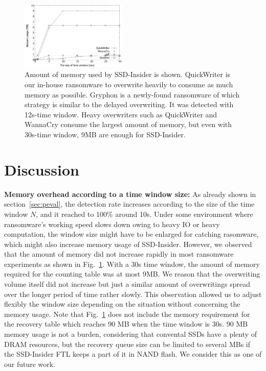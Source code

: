 \documentclass[conference]{IEEEtran}
\newcommand{\ours}{SSD-Insider}
\begin{document}
\begin{figure}[t]
	\includegraphics[width=0.45\textwidth]{fig/exp-det-mem.png}
	\caption{Amount of memory used by \ours{} is shown. QuickWriter is our in-house ransomware 
	to overwrite heavily to consume as much memory as possible.
	Gryphon is a newly-found ransomware of which strategy is similar to the delayed overwriting.
	It was detected with 12s-time window. Heavy overwriters such as QuickWriter and WannaCry
	consume the largest amount of memory, but even with 30s-time window, 9MB are enough for \ours{}.}\label{fig-wsize}
\end{figure}

\section{Discussion}
{\bf Memory overhead according to a time window size:} 
As already shown in section~\ref{sec:peval}, the detection rate
increases according to the size of the time window $N$, and it
reached to 100\% around 10s.  Under some environment where
ransomware's working speed slows down owing to heavy IO or heavy
computation, the window size might have to be enlarged for catching
rasomware, which might also increase memory usage of \ours{}.
However, we observed that the amount of memory did not increase
rapidly in most ransomware experiments as shown in
Fig.~\ref{fig-wsize}. With a 30s time window, the amount of memory
required for the counting table was at most 9MB.  We reason that
the overwriting volume itself did not increase but just a similar
amount of overwritings spread over the longer  period of time
rather slowly. This observation allowed us to adjust flexibly the
window size depending on the situation without concerning the
memory usage. Note that Fig.~\ref{fig-wsize} does not include the
memory requirement for the recovery table which reaches 90 MB when
the time window is 30s. 90 MB memory usage is not a burden,
considering that convental SSDs have a plenty of DRAM resources,
but the recovery queue size can be limited to several MBs if the
SSD-Insider FTL keeps a part of it in NAND flash. We consider this
as one of our future work.
\end{document}
